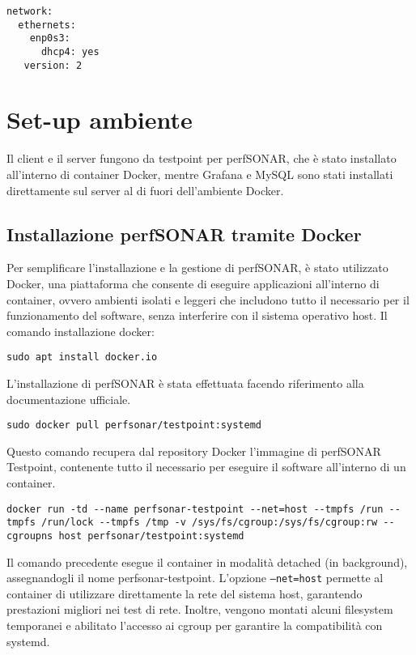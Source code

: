 \documentclass[12pt,a4paper]{report}
\begin{document}
\begin{lstlisting}
network:
  ethernets:
    enp0s3:
      dhcp4: yes
   version: 2   
\end{lstlisting}






\chapter{Set-up ambiente}
Il client e il server fungono da testpoint per perfSONAR, che è stato installato all’interno di container Docker, mentre Grafana e MySQL sono stati installati direttamente sul server al di fuori dell’ambiente Docker.
\section{Installazione perfSONAR tramite Docker}
Per semplificare l’installazione e la gestione di perfSONAR, è stato utilizzato Docker, una piattaforma che consente di eseguire applicazioni all'interno di container, ovvero ambienti isolati e leggeri che includono tutto il necessario per il funzionamento del software, senza interferire con il sistema operativo host.
Il comando installazione docker:
\begin{lstlisting}
sudo apt install docker.io 
\end{lstlisting}L’installazione di perfSONAR è stata effettuata facendo riferimento alla documentazione ufficiale.
\begin{lstlisting}
sudo docker pull perfsonar/testpoint:systemd
\end{lstlisting} Questo comando recupera dal repository Docker l’immagine di perfSONAR Testpoint, contenente tutto il necessario per eseguire il software all'interno di un container.
\begin{lstlisting}
docker run -td --name perfsonar-testpoint --net=host --tmpfs /run --tmpfs /run/lock --tmpfs /tmp -v /sys/fs/cgroup:/sys/fs/cgroup:rw --cgroupns host perfsonar/testpoint:systemd
\end{lstlisting}Il comando precedente esegue il container in modalità detached (in background), assegnandogli il nome perfsonar-testpoint. L'opzione \texttt{--net=host} permette al container di utilizzare direttamente la rete del sistema host, garantendo prestazioni migliori nei test di rete. Inoltre, vengono montati alcuni filesystem temporanei e abilitato l'accesso ai cgroup per garantire la compatibilità con systemd.
\end{document}
